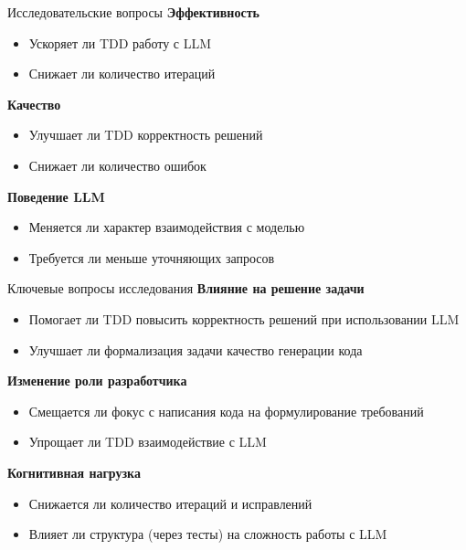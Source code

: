 \documentclass[14pt,aspectratio=169]{beamer}
\begin{document}
\begin{frame}{Исследовательские вопросы}
\textbf{Эффективность}
\begin{itemize}
    \item Ускоряет ли TDD работу с LLM
    \item Снижает ли количество итераций
\end{itemize}

\vspace{0.5em}

\textbf{Качество}
\begin{itemize}
    \item Улучшает ли TDD корректность решений
    \item Снижает ли количество ошибок
\end{itemize}

\vspace{0.5em}

\textbf{Поведение LLM}
\begin{itemize}
    \item Меняется ли характер взаимодействия с моделью
    \item Требуется ли меньше уточняющих запросов
\end{itemize}
\end{frame}

\begin{frame}{Ключевые вопросы исследования}
\textbf{Влияние на решение задачи}
\begin{itemize}
    \item Помогает ли TDD повысить корректность решений при использовании LLM
    \item Улучшает ли формализация задачи качество генерации кода
\end{itemize}

\vspace{0.5em}

\textbf{Изменение роли разработчика}
\begin{itemize}
    \item Смещается ли фокус с написания кода на формулирование требований
    \item Упрощает ли TDD взаимодействие с LLM
\end{itemize}

\vspace{0.5em}

\textbf{Когнитивная нагрузка}
\begin{itemize}
    \item Снижается ли количество итераций и исправлений
    \item Влияет ли структура (через тесты) на сложность работы с LLM
\end{itemize}
\end{frame}
\end{document}
